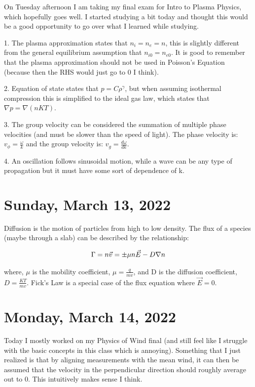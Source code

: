 \documentclass[12pt]{report}
\begin{document}
\par
On Tuesday afternoon I am taking my final exam for Intro to Plasma Physics, which hopefully goes well.  I started studying a bit today and thought this would be a good opportunity to go over what I learned while studying. 

\par
1. The plasma approximation states that $n_i = n_e = n$, this is slightly different from the general equilibrium assumption that $n_{i0} = n_{e0}$. It is good to remember that the plasma approximation should not be used in Poisson's Equation (because then the RHS would just go to 0 I think).
\par
2. Equation of state states that $p = C\rho^\gamma$, but when assuming isothermal compression this is simplified to the ideal gas law, which states that $\nabla p = \nabla (nKT)$. 
\par
3. The group velocity can be considered the summation of multiple phase velocities (and must be slower than the speed of light). The phase velocity is: $v_\phi = \frac{\omega}{k}$ and the group velocity is: $v_g = \frac{d\omega}{dk}$.
\par
4. An oscillation follows sinusoidal motion, while a wave can be any type of propagation but it must have some sort of dependence of k. 

\section{Sunday, March 13, 2022}

\par
Diffusion is the motion of particles from high to low density. The flux of a species (maybe through a slab) can be described by the relationship:

\begin{equation}
\centering
\Gamma = n \vec{v} = \pm \mu n \vec{E} - D \nabla n 
\end{equation}

where, $\mu$ is the mobility coefficient, $\mu = \frac{q}{mv}$, and D is the diffusion coefficient, $D = \frac{KT}{mv}$. Fick's Law is a special case of the flux equation where $\vec{E} = 0$.

\section{Monday, March 14, 2022}

\par
Today I mostly worked on my Physics of Wind final (and still feel like I struggle with the basic concepts in this class which is annoying). Something that I just realized is that by aligning measurements with the mean wind, it can then be assumed that the velocity in the perpendicular direction should roughly average out to 0. This intuitively makes sense I think.
\end{document}
